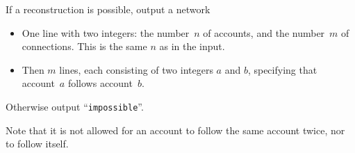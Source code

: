 

If a reconstruction is possible, output a network
\begin{itemize}
\item One line with two integers: the number~$n$ of accounts, and the number~$m$ of connections. This is the same $n$ as in the input.
\item Then $m$ lines, each consisting of two integers $a$ and $b$, specifying that account~$a$ follows account~$b$.
\end{itemize}

Otherwise output ``\texttt{impossible}''.

Note that it is not allowed for an account to follow the same account twice, nor to follow itself.
